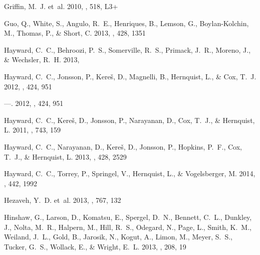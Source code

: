 \documentclass[iop]{emulateapj}
\begin{document}
\begin{thebibliography}{106}
{Griffin}, M.~J. {et~al.} 2010, \aap, 518, L3+

{Guo}, Q., {White}, S., {Angulo}, R.~E., {Henriques}, B., {Lemson}, G.,
  {Boylan-Kolchin}, M., {Thomas}, P., \& {Short}, C. 2013, \mnras, 428, 1351

{Hayward}, C.~C., {Behroozi}, P.~S., {Somerville}, R.~S., {Primack}, J.~R.,
  {Moreno}, J., \& {Wechsler}, R.~H. 2013{}, \mnras

{Hayward}, C.~C., {Jonsson}, P., {Kere{\v s}}, D., {Magnelli}, B., {Hernquist},
  L., \& {Cox}, T.~J. 2012{}, \mnras, 424, 951

---. 2012{}, \mnras, 424, 951

{Hayward}, C.~C., {Kere{\v s}}, D., {Jonsson}, P., {Narayanan}, D., {Cox},
  T.~J., \& {Hernquist}, L. 2011, \apj, 743, 159

{Hayward}, C.~C., {Narayanan}, D., {Kere{\v s}}, D., {Jonsson}, P., {Hopkins},
  P.~F., {Cox}, T.~J., \& {Hernquist}, L. 2013{}, \mnras, 428, 2529

{Hayward}, C.~C., {Torrey}, P., {Springel}, V., {Hernquist}, L., \&
  {Vogelsberger}, M. 2014, \mnras, 442, 1992

{Hezaveh}, Y.~D. {et~al.} 2013, \apj, 767, 132

{Hinshaw}, G., {Larson}, D., {Komatsu}, E., {Spergel}, D.~N., {Bennett}, C.~L.,
  {Dunkley}, J., {Nolta}, M.~R., {Halpern}, M., {Hill}, R.~S., {Odegard}, N.,
  {Page}, L., {Smith}, K.~M., {Weiland}, J.~L., {Gold}, B., {Jarosik}, N.,
  {Kogut}, A., {Limon}, M., {Meyer}, S.~S., {Tucker}, G.~S., {Wollack}, E., \&
  {Wright}, E.~L. 2013, \apjs, 208, 19


\end{thebibliography}
\end{document}
